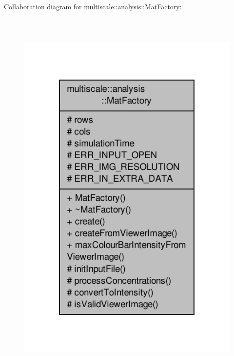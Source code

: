 Collaboration diagram for multiscale\-:\-:analysis\-:\-:Mat\-Factory\-:\nopagebreak
\begin{figure}[H]
\begin{center}
\leavevmode
\includegraphics[height=550pt]{classmultiscale_1_1analysis_1_1MatFactory__coll__graph}
\end{center}
\end{figure}
